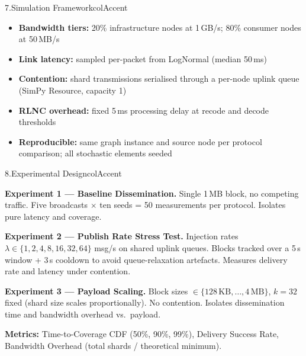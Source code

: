 \documentclass[final]{beamer}
\newcommand{\pbody}{\fontsize{21}{27}\selectfont}
\newlength{\colwidth}
\begin{document}
\begin{frame}[t]
\begin{columns}[T, totalwidth=0.97\paperwidth]
\begin{column}{\colwidth}
\begin{panel}{7.\enspace Simulation Framework}{colAccent}
  \begin{itemize}\setlength\itemsep{4pt}
    \item \textbf{Bandwidth tiers:} 20\% infrastructure nodes at 1\,GB/s; 80\% consumer nodes at 50\,MB/s
    \item \textbf{Link latency:} sampled per-packet from LogNormal (median 50\,ms)
    \item \textbf{Contention:} shard transmissions serialised through a per-node uplink queue (SimPy Resource, capacity 1)
    \item \textbf{RLNC overhead:} fixed 5\,ms processing delay at recode and decode thresholds
    \item \textbf{Reproducible:} same graph instance and source node per protocol comparison; all stochastic elements seeded
  \end{itemize}
    
\end{panel}


\vspace{6mm}


\begin{panel}{8.\enspace Experimental Design}{colAccent}
  \pbody\justifying

  \textbf{Experiment 1 --- Baseline Dissemination.} Single 1\,MB block, no competing traffic. Five broadcasts $\times$ ten seeds = 50 measurements per protocol. Isolates pure latency and coverage.

  \vspace{6pt}

  \textbf{Experiment 2 --- Publish Rate Stress Test.} Injection rates $\lambda \in \{1,2,4,8,16,32,64\}$ msg/s on shared uplink queues. Blocks tracked over a 5\,s window + 3\,s cooldown to avoid queue-relaxation artefacts. Measures delivery rate and latency under contention.

  \vspace{6pt}

  \textbf{Experiment 3 --- Payload Scaling.} Block sizes $\in \{128\,\text{KB},\ldots,4\,\text{MB}\}$, $k=32$ fixed (shard size scales proportionally). No contention. Isolates dissemination time and bandwidth overhead vs.\ payload.

  \vspace{7pt}

  \textbf{Metrics:} Time-to-Coverage CDF (50\%, 90\%, 99\%), Delivery Success Rate, Bandwidth Overhead (total shards / theoretical minimum).


\end{panel}
\end{column}
\end{columns}
\end{frame}
\end{document}

